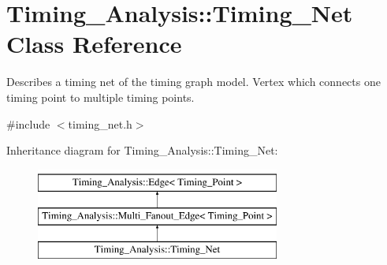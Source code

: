 \hypertarget{classTiming__Analysis_1_1Timing__Net}{\section{Timing\-\_\-\-Analysis\-:\-:Timing\-\_\-\-Net Class Reference}
\label{classTiming__Analysis_1_1Timing__Net}
}


Describes a timing net of the timing graph model. Vertex which connects one timing point to multiple timing points.  




{\ttfamily \#include $<$timing\-\_\-net.\-h$>$}

Inheritance diagram for Timing\-\_\-\-Analysis\-:\-:Timing\-\_\-\-Net\-:\begin{figure}[H]
\begin{center}
\leavevmode
\includegraphics[height=3.000000cm]{classTiming__Analysis_1_1Timing__Net}
\end{center}
\end{figure}
